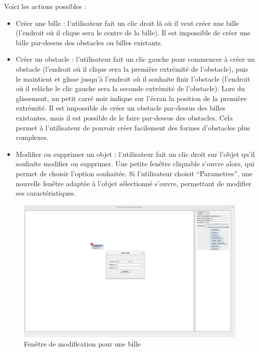 \documentclass{report}
\begin{document}
Voici les actions possibles :
\begin{itemize}
\item Créer une bille : l’utilisateur fait un clic droit là où il veut créer une bille (l’endroit où il clique sera le centre de la bille). Il est impossible de créer une bille par-dessus des obstacles ou billes existants.
\item Créer un obstacle : l’utilisateur fait un clic gauche pour commencer à créer un obstacle (l’endroit où il clique sera la première extrémité de l’obstacle), puis le maintient et glisse jusqu’à l’endroit où il souhaite finir l’obstacle (l’endroit où il relâche le clic gauche sera la seconde extrémité de l’obstacle). Lors du glissement, un petit carré noir indique sur l’écran la position de la première extrémité. Il est impossible de créer un obstacle par-dessus des billes existantes, mais il est possible de le faire par-dessus des obstacles. Cela permet à l’utilisateur de pouvoir créer facilement des formes d’obstacles plus complexes.
\item Modifier ou supprimer un objet : l’utilisateur fait un clic droit sur l’objet qu’il souhaite modifier ou supprimer. Une petite fenêtre cliquable s’ouvre alors, qui permet de choisir l’option souhaitée. Si l’utilisateur choisit “Parametres”, une nouvelle fenêtre adaptée à l’objet sélectionné s’ouvre, permettant de modifier ses caractéristiques.
\end{itemize}

\begin{figure}[H]
\centering
\includegraphics[scale=0.25]{modifier_bille.png}
\caption{Fenêtre de modification pour une bille}
\end{figure}
\end{document}
